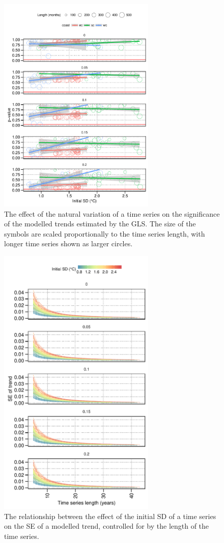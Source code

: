 \documentclass[]{ametsoc}
\begin{document}
\begin{figure}
\centering \includegraphics[width=7.5cm]{figure04}
\caption[\small The effect of the natural variation of a time series on the significance of the modelled trend]{The effect of the natural variation of a time series on the significance of the modelled trends estimated by the GLS. The size of the symbols are scaled proportionally to the time series length, with longer time series shown as larger circles.}
\label{figure04}
\end{figure}

\begin{figure}
\centering \includegraphics[width=7.5cm]{figure05}
\caption[\small The relationship between the effect of initial SD on the SE of a modelled trend]{The relationship between the effect of the initial SD of a time series on the SE of a modelled trend, controlled for by the length of the time series.}
\label{figure05}
\end{figure}
\end{document}
